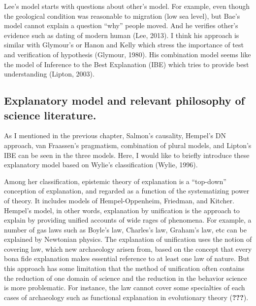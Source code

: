 \documentclass[american,man]{apa6}
\begin{document}
Lee's model starts with questions about other's model. For example, even
though the geological condition was reasonable to migration (low sea
level), but Bae's model cannot explain a question \enquote{why} people
moved. And he verifies other's evidence such as dating of modern human
(Lee, 2013). I think his approach is similar with Glymour's or Hanon and
Kelly which stress the importance of test and verification of hypothesis
(Glymour, 1980). His combination model seems like the model of Inference
to the Best Explanation (IBE) which tries to provide best understanding
(Lipton, 2003).

\subsection{Explanatory model and relevant philosophy of science
literature.}\label{explanatory-model-and-relevant-philosophy-of-science-literature.}

As I mentioned in the previous chapter, Salmon's causality, Hempel's DN
approach, van Fraassen's pragmatism, combination of plural models, and
Lipton's IBE can be seen in the three models. Here, I would like to
briefly introduce these explanatory model based on Wylie's
classification (Wylie, 1996).

Among her classification, epistemic theory of explanation is a
\enquote{top-down} conception of explanation, and regarded as a function
of the systematizing power of theory. It includes models of
Hempel-Oppenheim, Friedman, and Kitcher. Hempel's model, in other words,
explanation by unification is the approach to explain by providing
unified accounts of wide rages of phenomena. For example, a number of
gas laws such as Boyle's law, Charles's law, Graham's law, etc can be
explained by Newtonian physics. The explanation of unification uses the
notion of covering law, which new archaeology arisen from, based on the
concept that every bona fide explanation makes essential reference to at
least one law of nature. But this approach has some limitation that the
method of unification often contains the reduction of one domain of
science and the reduction in the behavior science is more problematic.
For instance, the law cannot cover some specialties of each cases of
archaeology such as functional explanation in evolutionary theory
({\textbf{???}}).
\end{document}
